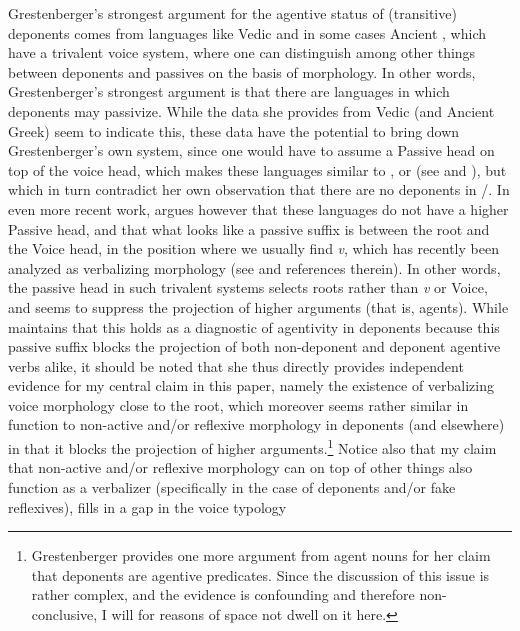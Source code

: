 \documentclass[output=paper]{langsci/langscibook}
\begin{document}
Grestenberger’s strongest argument for the agentive status of (transitive)
deponents comes from languages like Vedic and in some cases Ancient ,\linebreak
which have a trivalent voice system, where one can distinguish among other
things between deponents and passives on the basis of morphology. In other
words, Grestenberger’s strongest argument is that there are languages in which
deponents may passivize. While the data she provides from Vedic (and Ancient
Greek) seem to indicate this, these data have the potential to bring down
Grestenberger’s own system, since one would have to assume a Passive head on
top of the voice head, which makes these languages similar to , 
or  (see \citealt{Alexiadou2013} and \citealt{AlexiadouEtAl2015}), but
which in turn contradict her own observation that there are no deponents in
/. In even more recent work, \citet{Grestenberger2018b} argues
however that these languages do not have a higher Passive head, and that what
looks like a passive suffix is between the root and the Voice head, in the
position where we usually find \emph{v}, which has recently been analyzed as
verbalizing morphology (see \citealt{AlexiadouEtAl2015} and references
therein). In other words, the passive head in such trivalent systems selects
roots rather than \emph{v} or Voice, and seems to suppress the projection of
higher arguments (that is, agents). While \citeauthor{Grestenberger2014}
maintains that this holds as a diagnostic of agentivity in deponents because
this passive suffix blocks the projection of both non-deponent and deponent
agentive verbs alike, it should be noted that she thus directly provides
independent evidence for my central claim in this paper, namely the existence
of verbalizing voice morphology close to the root, which moreover seems rather
similar in function to non-active and/or reflexive morphology in deponents (and
elsewhere) in that it blocks the projection of higher
arguments.\footnote{Grestenberger provides one more argument from agent nouns
    for her claim that deponents are agentive predicates. Since the discussion
    of this issue is rather complex, and the evidence is confounding and
therefore non-conclusive, I will for reasons of space not dwell on it here.}
Notice also that my claim that non-active and/or reflexive morphology can on
top of other things also function as a verbalizer (specifically in the case of
deponents and/or fake reflexives), fills in a gap in the voice typology
\end{document}
